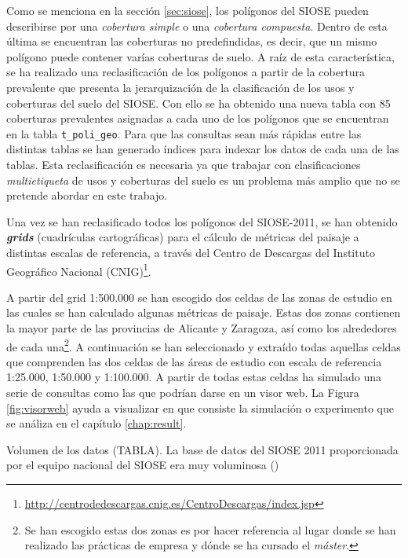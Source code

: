 Como se menciona en la sección \ref{sec:siose}, los polígonos del SIOSE pueden describirse por una \textit{cobertura simple} o una \textit{cobertura compuesta}. Dentro de esta última se encuentran las coberturas no predefindidas, es decir, que un mismo polígono puede contener varías coberturas de suelo. A raíz de esta característica, se ha realizado una reclasificación de los polígonos a partir de la cobertura prevalente que presenta la jerarquización de la clasificación de los usos y coberturas del suelo del SIOSE. Con ello se ha obtenido una nueva tabla con 85 coberturas prevalentes asignadas a cada uno de los polígonos que se encuentran en la tabla \texttt{t\_poli\_geo}. Para que las consultas sean más rápidas entre las distintas tablas se han generado índices para indexar los datos de cada una de las tablas. Esta reclasificación es necesaria ya que trabajar con clasificaciones \textit{multietiqueta} de usos y coberturas del suelo es un problema más amplio que no se pretende abordar en este trabajo.

Una vez se han reclasificado todos los polígonos del SIOSE-2011, se han obtenido \textbf{\textit{grids}} (cuadrículas cartográficas) para el cálculo de métricas del paisaje a distintas escalas de referencia, a través del Centro de Descargas del Instituto Geográfico Nacional (CNIG)\footnote{\url{http://centrodedescargas.cnig.es/CentroDescargas/index.jsp}}.

A partir del grid 1:500.000 se han escogido dos celdas de las zonas de estudio en las cuales se han calculado algunas métricas de paisaje. Estas dos zonas contienen la mayor parte de las provincias de Alicante y Zaragoza, así como los alrededores de cada una\footnote{Se han escogido estas dos zonas es por hacer referencia al lugar donde se han realizado las prácticas de empresa y dónde se ha cursado el \textit{máster}.}. A continuación se han seleccionado y extraído todas aquellas celdas que comprenden las dos celdas de las áreas de estudio con escala de referencia 1:25.000, 1:50.000 y 1:100.000. A partir de todas estas celdas ha simulado una serie de consultas como las que podrían darse en un visor web. La Figura \ref{fig:visorweb} ayuda a visualizar en que consiste la simulación o experimento que se análiza en el capítulo \ref{chap:result}.

Volumen de los datos (TABLA). La base de datos del SIOSE 2011 proporcionada por el equipo nacional del SIOSE era muy voluminosa ()

